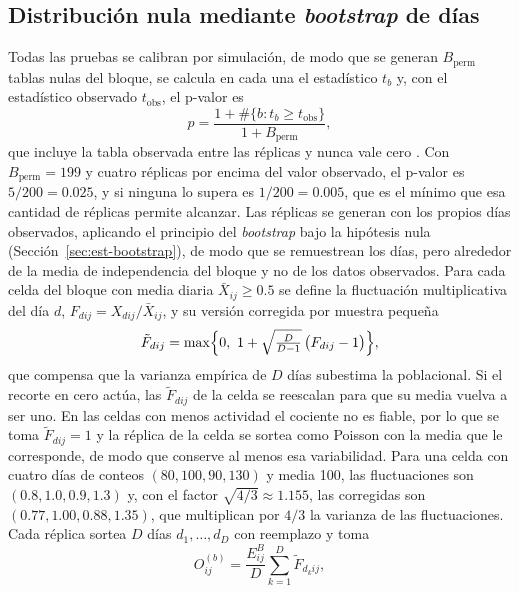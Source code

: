\subsection{Distribución nula mediante \emph{bootstrap} de días}\label{sec:prop-bootstrap}

Todas las pruebas se calibran por simulación, de modo que se generan $B_{\mathrm{perm}}$
tablas nulas del bloque, se calcula en cada una el estadístico $t_b$ y, con el
estadístico observado $t_{\mathrm{obs}}$, el p-valor es
\begin{equation}\label{eq:prop-pval}
  p = \frac{1 + \#\{b : t_b \ge t_{\mathrm{obs}}\}}{1 + B_{\mathrm{perm}}},
\end{equation}
que incluye la tabla observada entre las réplicas y nunca vale cero
\citep{Phipson2010}. Con $B_{\mathrm{perm}}=199$ y cuatro réplicas por encima del
valor observado, el p-valor es $5/200 = 0.025$, y si ninguna lo supera es
$1/200 = 0.005$, que es el mínimo que esa cantidad de réplicas permite alcanzar.
Las réplicas se generan con los propios días observados, aplicando el principio
del \emph{bootstrap} bajo la hipótesis nula (Sección~\ref{sec:est-bootstrap}), de modo
que se remuestrean los días, pero alrededor de la media de independencia del bloque y
no de los datos observados. Para cada celda del
bloque con media diaria $\bar X_{ij}\ge 0.5$ se define la fluctuación
multiplicativa del día $d$, $F_{dij} = X_{dij}/\bar X_{ij}$, y su versión
corregida por muestra pequeña
\begin{equation}\label{eq:prop-fluctuacion}
  \tilde F_{dij} = \max\Bigl\{0,\ 1 + \sqrt{\tfrac{D}{D-1}}\,\bigl(F_{dij}-1\bigr)\Bigr\},
\end{equation}
que compensa que la varianza empírica de $D$ días subestima la poblacional. Si
el recorte en cero actúa, las $\tilde F_{dij}$ de la celda se reescalan para que
su media vuelva a ser uno. En las celdas con menos actividad el cociente no es
fiable, por lo que se toma $\tilde F_{dij}=1$ y la réplica de la celda se sortea como
Poisson con la media que le corresponde, de modo que conserve al menos esa
variabilidad. Para una celda con
cuatro días de conteos $(80,100,90,130)$ y media 100, las fluctuaciones son
$(0.8,1.0,0.9,1.3)$ y, con el factor $\sqrt{4/3}\approx1.155$, las corregidas son
$(0.77,1.00,0.88,1.35)$, que multiplican por $4/3$ la varianza de las
fluctuaciones. Cada réplica sortea
$D$ días $d_1,\dots,d_D$ con reemplazo y toma
\begin{equation}\label{eq:prop-bootstrap}
  O^{(b)}_{ij} = \frac{E^B_{ij}}{D}\sum_{k=1}^{D} \tilde F_{d_k ij},
\end{equation}
